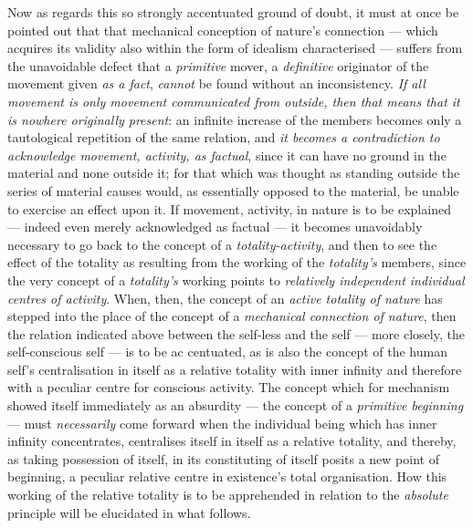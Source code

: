 \documentclass[12pt,a4paper]{book}
\begin{document}
Now as regards this so strongly accentuated ground of doubt, it must at once be
pointed out that that mechanical conception of nature's connection --- which
acquires its validity also within the form of idealism characterised --- suffers
from the unavoidable defect that a \emph{primitive} mover, a \emph{definitive}
originator of the movement given \emph{as a fact}, \emph{cannot} be found
without an inconsistency. \emph{If all movement is only movement communicated
from outside, then that means that it is nowhere originally present}: an
infinite increase of the members becomes only a tautological repetition of the
same relation, and \emph{it becomes a contradiction to acknowledge movement,
activity, as factual}, since it can have no ground in the material and none
outside it; for that which was thought as standing outside the series of
material causes would, as essentially opposed to the material, be unable to
exercise an effect upon it. If movement, activity, in nature is to be
explained --- indeed even merely acknowledged as factual --- it becomes
unavoidably necessary to go back to the concept of a \emph{totality-activity},
and then to see the effect of the totality as resulting from the working of the
\emph{totality's} members, since the very concept of a \emph{totality's} working
points to \emph{relatively independent individual centres of activity}. When,
then, the concept of an \emph{active totality of nature} has stepped into the
place of the concept of a \emph{mechanical connection of nature}, then the
relation indicated above between the self-less and the self --- more closely,
the self-conscious self --- is to be ac\-%
centuated, as is also the concept of the human self's centralisation in itself
as a relative totality with inner infinity and therefore with a peculiar centre
for conscious activity. The concept which for mechanism showed itself
immediately as an absurdity --- the concept of a \emph{primitive beginning} ---
must \emph{necessarily} come forward when the individual being which has inner
infinity concentrates, centralises itself in itself as a relative totality, and
thereby, as taking possession of itself, in its constituting of itself posits a
new point of beginning, a peculiar relative centre in existence's total
organisation. How this working of the relative totality is to be apprehended in
relation to the \emph{absolute} principle will be elucidated in what follows.
\end{document}

